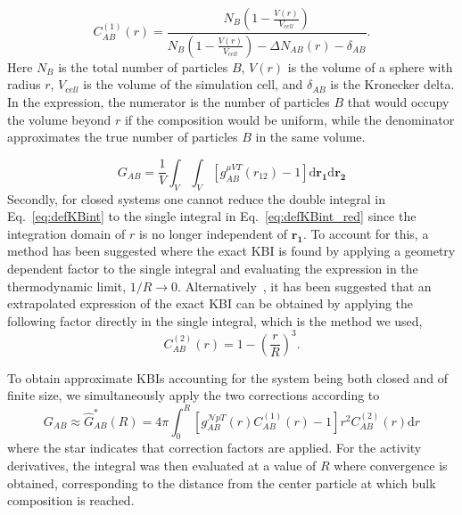 \documentclass[
journal=jctcce,
manuscript=letter]{achemso}
\begin{document}
\begin{equation}
C_{AB}^{(1)}(r) = \frac {N_B\left (1-\frac{V(r)}{V_{cell}} \right )} {{N_B\left (1-\frac{V(r)}{V_{cell}} \right )}-\Delta N_{AB}(r)-\delta _{AB}}.
\label{eq:1stCorr}
\end{equation}
Here $N_B$ is the total number of particles $B$, $V(r)$ is the volume of a sphere with radius $r$, $V_{cell}$ is the volume of the simulation cell, and $\delta_{AB}$ is the Kronecker delta. In the expression, the numerator is the number of particles $B$ that would occupy the volume beyond $r$ if the composition would be uniform, while the denominator approximates the true number of particles $B$ in the same volume. 

\begin{equation}
G_{AB}=\frac{1}{V}\int_{V}\int_{V}[g_{AB}^{\mu VT}(r_{12})-1]\textrm{d}\mathbf{r_1}\textrm{d}\mathbf{r_2}
\label{eq:defKBint}
\end{equation}
Secondly, for closed systems one cannot reduce the double integral in Eq.~\ref{eq:defKBint} to the single integral in Eq.~\ref{eq:defKBint_red} since the integration domain of $r$ is no longer independent of $\mathbf{r_1}$.
To account for this, a method has been suggested\cite{Krger2013} where the exact KBI is found by applying a geometry dependent factor to the single integral and evaluating the expression in the thermodynamic limit, $1/R \rightarrow 0$.
Alternatively~\cite{Krger2013}, it has been suggested that an extrapolated expression of the exact KBI can be obtained by applying the following factor directly in the single integral, which is the method we used,
\begin{equation}
C_{AB}^{(2)}(r) = 1-\left( \frac{r}{R} \right)^3.
\label{eq:2ndCorr}
\end{equation}

To obtain approximate KBIs accounting for the system being both closed and of finite size, we simultaneously apply the two corrections\cite{Milzetti2018} according to
\begin{equation}
G_{AB}\approx  \hat{G}_{AB}^*(R)=4\pi\int_{0}^{R} [g_{AB}^{\mathcal{N}pT}(r)C_{AB}^{(1)}(r)-1]r^{2}C_{AB}^{(2)}(r)\textrm{d}r
\label{eq:dblApprKBint}
\end{equation}
where the star indicates that correction factors are applied. For the activity derivatives, the integral was then evaluated at a value of $R$ where convergence is obtained, corresponding to the distance from the center particle at which bulk composition is reached.
\end{document}
